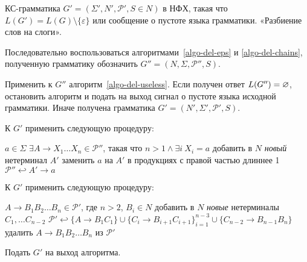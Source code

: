 {КС-грамматика
$G'=(\Sigma', N', \mathcal P', S \in N)$ в НФХ, такая что $L(G')=L(G) \setminus
\{ \varepsilon \}$ или сообщение о пустоте языка грамматики.}
{«Разбиение слов на слоги».}
{
    \item Последовательно воспользоваться
    алгоритмами~\ref{algo-del-eps} и \ref{algo-del-chains}, полученную
    грамматику обозначить $G'' = (N, \Sigma, \mathcal P'', S)$.
    \item Применить к $G''$ алгоритм~\ref{algo-del-useless}. Если получен ответ
    $L(G'')=\varnothing$, остановить алгоритм и подать на выход сигнал о пустоте языка
    исходной грамматики. Иначе получена грамматика $G' = (N', \Sigma',
    \mathcal P', S)$.
    \item\label{process-terminals}К $G'$ применить следующую процедуру:
    \begin{codebox}
    \zi \For $a \in \Sigma$
    \zi \Do
            \If $\exists A \to X_1 \ldots X_n \in \mathcal P''$, такая что
            $n > 1 \wedge \exists i\: X_i = a$
    \zi     \Then
    \li     добавить в $N$ \emph{новый} нетерминал $A'$
    \li     заменить $a$ на $A'$ в продукциях с правой частью длиннее 1
    \li     $\mathcal P'' \hookleftarrow A' \to a$
            \End
        \End
    \end{codebox}
    \item\label{breaking-words}К $G'$ применить следующую процедуру:
    \begin{codebox}
    \zi \For $A \to B_1 B_2 \ldots B_n \in \mathcal P'$,
        где $n > 2$, $B_i \in N$
    \zi \Do
    \li     добавить в $N$ \emph{новые} нетерминалы $C_1, \ldots C_{n-2}$
    \li     $\mathcal P' \hookleftarrow
            \{ A \to B_1C_1\} \cup \{ C_i \to B_{i+1} C_{i+1} \}_{i=1}^{n-3}
            \cup \{ C_{n-2} \to B_{n-1}B_n \}$
    \li     удалить $A \to B_1 B_2 \ldots B_n$ из $\mathcal P'$
        \End
    \end{codebox}
    Подать $G'$ на выход алгоритма.
}

